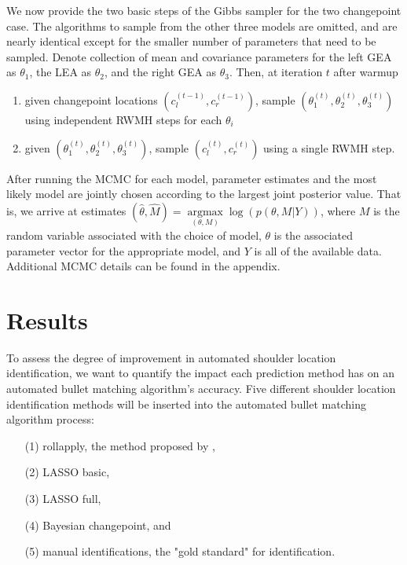 \documentclass[12pt]{article}
\providecommand{\tightlist}{%
  \setlength{\itemsep}{0pt}\setlength{\parskip}{0pt}}
\begin{document}
We now provide the two basic steps of the Gibbs sampler for the two
changepoint case. The algorithms to sample from the other three models
are omitted, and are nearly identical except for the smaller number of
parameters that need to be sampled. Denote collection of mean and
covariance parameters for the left GEA as \(\theta_1\), the LEA as
\(\theta_2\), and the right GEA as \(\theta_3\). Then, at iteration
\(t\) after warmup

\begin{enumerate}
\def\labelenumi{\arabic{enumi}.}
\tightlist
\item
  given changepoint locations \((c_l^{(t - 1)}, c_r^{(t - 1)})\), sample
  \((\theta_1^{(t)}, \theta_2^{(t)}, \theta_3^{(t)})\) using independent
  RWMH steps for each \(\theta_i\)
\item
  given \((\theta_1^{(t)}, \theta_2^{(t)}, \theta_3^{(t)})\), sample
  \((c_l^{(t)}, c_r^{(t)})\) using a single RWMH step.
\end{enumerate}

After running the MCMC for each model, parameter estimates and the most
likely model are jointly chosen according to the largest joint posterior
value. That is, we arrive at estimates
\((\hat{\theta}, \hat{M}) = \underset{(\theta, M)}{\operatorname{argmax}}{\log(p(\theta, M | Y))}\),
where \(M\) is the random variable associated with the choice of model,
\(\theta\) is the associated parameter vector for the appropriate model,
and \(Y\) is all of the available data. Additional MCMC details can be
found in the appendix.

\section{Results}

To assess the degree of improvement in automated shoulder location
identification, we want to quantify the impact each prediction method
has on an automated bullet matching algorithm's accuracy. Five different
shoulder location identification methods will be inserted into the
automated bullet matching algorithm process:

\begin{itemize}
\item[(1)] rollapply, the method proposed by \cite{Hare1}, 
\item[(2)] LASSO basic, 
\item[(3)] LASSO full,
\item[(4)] Bayesian changepoint, and
\item[(5)] manual identifications, the "gold standard" for identification.  
\end{itemize}
\end{document}
